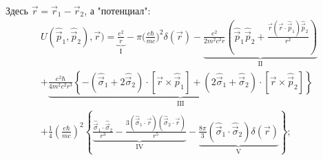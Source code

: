 \documentclass[a4paper, 14pt, russian]{article}
\begin{document}
{		Здесь $\vec r = \vec{r}_1 - \vec{r}_2$, а "потенциал":
		\begin{multline}
			\label{eq52}
			U(\hat{\vec p}_1, \hat{\vec p}_2), \vec r) = 
				\underbrace{\frac{e^2}{r}}_\text{I} - \pi \big(\frac{e\hbar}{mc}\big)^2 \delta(\vec r)
				- \underbrace{\frac{e^2}{2m^2 c^2 r} \left(\hat{\vec p}_1\hat{\vec p}_2
				+\frac{\vec r(\vec r \cdot \hat{\vec p}_1)\hat{\vec p}_2}{r^2}\right)}_\text{II}\\
				+ \underbrace{\frac{e^2 \hbar}{4m^2c^2 r^3}
				\left\{-(\hat{\vec \sigma}_1 + 2 \hat{\vec \sigma}_2)
				\cdot [\vec r \times \hat{\vec p}_1]
				+ (2\hat{\vec \sigma}_1 + \hat{\vec \sigma}_2)
				\cdot [\vec r \times \hat{\vec p}_2]\right\}}_\text{III}\\
				+ \frac{1}{4} \left(\frac{e\hbar}{mc}\right)^2
				\left\{\underbrace{\frac{\hat{\vec \sigma}_1 \cdot \hat{\vec \sigma}_2}{r^3}
				- \frac{3(\hat{\vec \sigma}_1\cdot \vec r)
				(\hat{\vec \sigma}_2\cdot \vec r)}{r^5}}_\text{IV}
				-\underbrace{\frac{8\pi}{3} (\hat{\vec \sigma}_1 \cdot \hat{\vec \sigma}_2) 
				\delta(\vec r)}_\text{V}\right\};
		\end{multline}
	}
\end{document}
